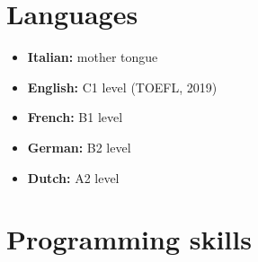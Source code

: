 \documentclass[10pt, a4paper, roman]{moderncv}        %
\begin{document}
	\section{Languages}
	
	\vspace{1pt}
	
	\begin{itemize}
		
		\item \textbf{Italian:} mother tongue
		
		\vspace{1pt}
		
		\item \textbf{English:} C1 level (TOEFL, 2019)
		
		\vspace{1pt}
		
		\item \textbf{French:} B1 level
		
		\vspace{1pt}
		
		\item \textbf{German:} B2 level
		
		\vspace{1pt}
		
		\item \textbf{Dutch:} A2 level
		
	\end{itemize}
	
	\vspace{2pt}
	
	\section{Programming skills}
	
	\vspace{1pt}
	
\end{document}
